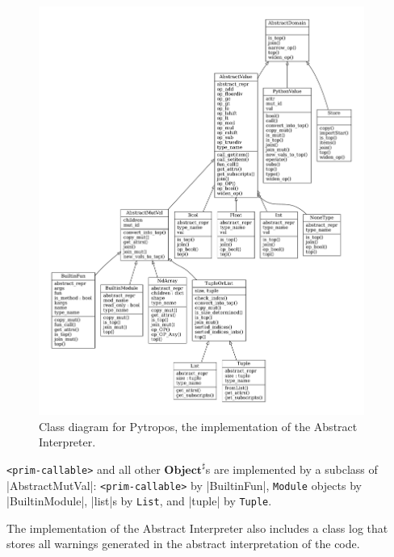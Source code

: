 \begin{figure}
\begin{center}
  \includegraphics[width=0.95\textwidth]{figures/classes_Pytropos-small.pdf}
\end{center}
\caption{Class diagram for Pytropos, the implementation of the Abstract
  Interpreter.\label{classPytropos}}
\end{figure}


\texttt{<prim-callable>} and all other \(\mathbf{Object}^\sharp\)s are implemented by a
subclass of \pycode|AbstractMutVal|: \texttt{<prim-callable>} by \pycode|BuiltinFun|,
\texttt{Module} objects by \pycode|BuiltinModule|, \pycode|list|s by \texttt{List}, and
\pycode|tuple| by \texttt{Tuple}.

The implementation of the Abstract Interpreter also includes a class log that stores all
warnings generated in the abstract interpretation of the code.

